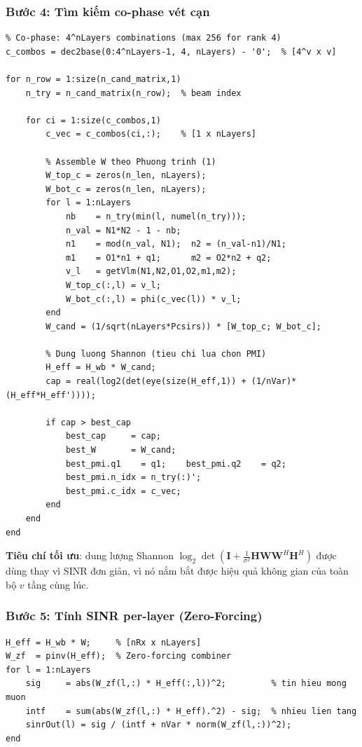 \documentclass[11pt,a4paper]{article}
\begin{document}
\subsubsection{Bước 4: Tìm kiếm co-phase vét cạn}

\begin{lstlisting}
% Co-phase: 4^nLayers combinations (max 256 for rank 4)
c_combos = dec2base(0:4^nLayers-1, 4, nLayers) - '0';  % [4^v x v]

for n_row = 1:size(n_cand_matrix,1)
    n_try = n_cand_matrix(n_row);  % beam index

    for ci = 1:size(c_combos,1)
        c_vec = c_combos(ci,:);    % [1 x nLayers]

        % Assemble W theo Phuong trinh (1)
        W_top_c = zeros(n_len, nLayers);
        W_bot_c = zeros(n_len, nLayers);
        for l = 1:nLayers
            nb    = n_try(min(l, numel(n_try)));
            n_val = N1*N2 - 1 - nb;
            n1    = mod(n_val, N1);  n2 = (n_val-n1)/N1;
            m1    = O1*n1 + q1;      m2 = O2*n2 + q2;
            v_l   = getVlm(N1,N2,O1,O2,m1,m2);
            W_top_c(:,l) = v_l;
            W_bot_c(:,l) = phi(c_vec(l)) * v_l;
        end
        W_cand = (1/sqrt(nLayers*Pcsirs)) * [W_top_c; W_bot_c];

        % Dung luong Shannon (tieu chi lua chon PMI)
        H_eff = H_wb * W_cand;
        cap = real(log2(det(eye(size(H_eff,1)) + (1/nVar)*(H_eff*H_eff'))));

        if cap > best_cap
            best_cap     = cap;
            best_W       = W_cand;
            best_pmi.q1    = q1;    best_pmi.q2    = q2;
            best_pmi.n_idx = n_try(:)';
            best_pmi.c_idx = c_vec;
        end
    end
end
\end{lstlisting}

\noindent\textbf{Tiêu chí tối ưu}: dung lượng Shannon
$\log_2\det\!\left(\mathbf{I} + \frac{1}{\sigma^2}\mathbf{H}\mathbf{W}\mathbf{W}^H\mathbf{H}^H\right)$
được dùng thay vì SINR đơn giản, vì nó nắm bắt được hiệu quả không gian
của toàn bộ $v$ tầng cùng lúc.

\subsubsection{Bước 5: Tính SINR per-layer (Zero-Forcing)}

\begin{lstlisting}
H_eff = H_wb * W;     % [nRx x nLayers]
W_zf  = pinv(H_eff);  % Zero-forcing combiner
for l = 1:nLayers
    sig     = abs(W_zf(l,:) * H_eff(:,l))^2;         % tin hieu mong muon
    intf    = sum(abs(W_zf(l,:) * H_eff).^2) - sig;  % nhieu lien tang
    sinrOut(l) = sig / (intf + nVar * norm(W_zf(l,:))^2);
end
\end{lstlisting}
\end{document}
